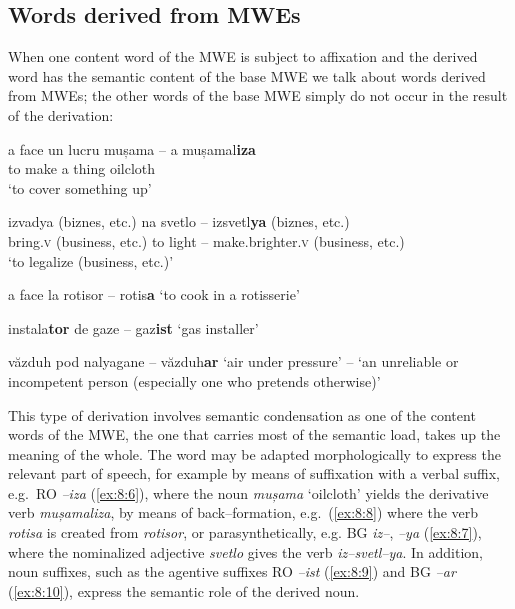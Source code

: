 \documentclass[output=paper]{langsci/langscibook}
\begin{document}
\subsection{Words derived from MWEs}
\label{wordsfrommwes}
When one content word of the MWE is subject to affixation and the
derived word has the semantic content of the base MWE we talk about
words derived from MWEs; the other words of the base MWE simply do not
occur in the result of the derivation:


\begin{exe}
\ex \label{ex:8:6}
\settowidth{}
\gll a face un lucru mușama – a mușamal\textbf{iza}  \\
 to make a thing oilcloth \\ 
\glt ‘to cover something up’
\end{exe}

\begin{exe}
\ex \label{ex:8:7}
\settowidth{}
\gll izvadya (biznes,  etc.) na svetlo – izsvetl\textbf{ya}
(biznes,  etc.)\\
 bring.\textsc{v} (business, etc.) to light – make.brighter.\textsc{v} (business, 
etc.) \\ 
\glt ‘to legalize (business, etc.)’
\end{exe}

\begin{exe}
\ex \label{ex:8:8}
\settowidth{}
a face la rotisor – rotis\textbf{a} 
‘to cook in a rotisserie’
\end{exe}

\begin{exe}
\ex \label{ex:8:9}
\settowidth{}
instala\textbf{tor }de gaze – gaz\textbf{ist} 
‘gas installer’
\end{exe}

\begin{exe}
\ex \label{ex:8:10}
\settowidth{}
 văzduh pod nalyagane – văzduh\textbf{ar} 
‘air under
pressure’ – ‘an unreliable or incompetent person (especially one who pretends otherwise)’
\end{exe}

This type of derivation involves semantic condensation as one of the
content words of the MWE, the one that carries most of the semantic
load, takes up the meaning of the whole. The word may be adapted
morphologically to express the relevant part of speech, for example by
means of suffixation with a verbal suffix, e.g.\ RO \textit{–iza} (\ref{ex:8:6}), where
the noun \textit{mușama} ‘oilcloth’ yields the derivative verb \textit{mușamaliza},
by means of back–formation, e.g.\ (\ref{ex:8:8}) where the verb \textit{rotisa} is created
from \textit{rotisor}, or parasynthetically, e.g. BG \textit{iz–}, \textit{–ya} (\ref{ex:8:7}), where
the nominalized adjective \textit{svetlo} gives the verb \textit{iz–svetl–ya}. In
addition, noun suffixes, such as the agentive suffixes RO \textit{–ist} (\ref{ex:8:9})
and BG \textit{–ar} (\ref{ex:8:10}), express the semantic role of the derived noun.
\end{document}
